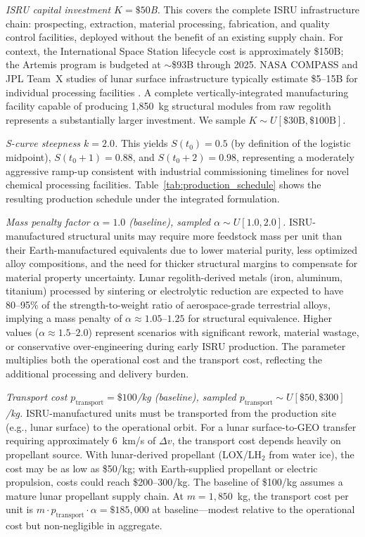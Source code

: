 \documentclass[preprint,12pt]{elsarticle}
\begin{document}
\emph{ISRU capital investment $K = \$50$B.} This covers the complete ISRU infrastructure chain: prospecting, extraction, material processing, fabrication, and quality control facilities, deployed without the benefit of an existing supply chain. For context, the International Space Station lifecycle cost is approximately \$150B; the Artemis program is budgeted at $\sim$\$93B through 2025. NASA COMPASS and JPL Team~X studies of lunar surface infrastructure typically estimate \$5--15B for individual processing facilities \cite{sanders2015,nasa2015handbook}. A complete vertically-integrated manufacturing facility capable of producing 1{,}850~kg structural modules from raw regolith represents a substantially larger investment. We sample $K \sim U[\$30\text{B}, \$100\text{B}]$.

\emph{S-curve steepness $k = 2.0$.} This yields $S(t_0) = 0.5$ (by definition of the logistic midpoint), $S(t_0 + 1) = 0.88$, and $S(t_0 + 2) = 0.98$, representing a moderately aggressive ramp-up consistent with industrial commissioning timelines for novel chemical processing facilities. Table~\ref{tab:production_schedule} shows the resulting production schedule under the integrated formulation.

\emph{Mass penalty factor $\alpha = 1.0$ (baseline), sampled $\alpha \sim U[1.0, 2.0]$.} ISRU-manufactured structural units may require more feedstock mass per unit than their Earth-manufactured equivalents due to lower material purity, less optimized alloy compositions, and the need for thicker structural margins to compensate for material property uncertainty. Lunar regolith-derived metals (iron, aluminum, titanium) processed by sintering or electrolytic reduction are expected to have 80--95\% of the strength-to-weight ratio of aerospace-grade terrestrial alloys, implying a mass penalty of $\alpha \approx 1.05$--$1.25$ for structural equivalence. Higher values ($\alpha \approx 1.5$--$2.0$) represent scenarios with significant rework, material wastage, or conservative over-engineering during early ISRU production. The parameter multiplies both the operational cost and the transport cost, reflecting the additional processing and delivery burden.

\emph{Transport cost $p_{\mathrm{transport}} = \$100$/kg (baseline), sampled $p_{\mathrm{transport}} \sim U[\$50, \$300]$/kg.} ISRU-manufactured units must be transported from the production site (e.g., lunar surface) to the operational orbit. For a lunar surface-to-GEO transfer requiring approximately 6~km/s of $\Delta v$, the transport cost depends heavily on propellant source. With lunar-derived propellant (LOX/LH$_2$ from water ice), the cost may be as low as \$50/kg; with Earth-supplied propellant or electric propulsion, costs could reach \$200--300/kg. The baseline of \$100/kg assumes a mature lunar propellant supply chain. At $m = 1{,}850$~kg, the transport cost per unit is $m \cdot p_{\mathrm{transport}} \cdot \alpha = \$185{,}000$ at baseline---modest relative to the operational cost but non-negligible in aggregate.
\end{document}
